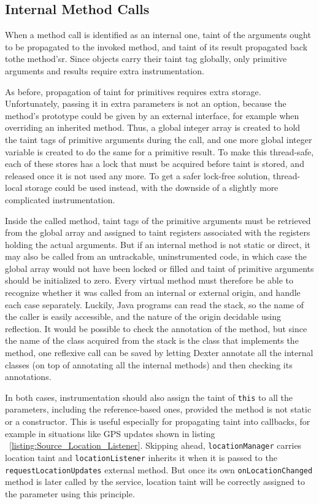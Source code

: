 \documentclass[12pt,twoside,notitlepage]{report}
\begin{document}
\subsection{Internal Method Calls}
\label{section:TaintPropagation_MethodCalls_Internal}

When a method call is identified as an internal one, taint of the arguments ought to be propagated to the invoked method, and taint of its result propagated back tothe method'sr. Since objects carry their taint tag globally, only primitive arguments and results require extra instrumentation. 

As before, propagation of taint for primitives requires extra storage. Unfortunately, passing it in extra parameters is not an option, because the method's prototype could be given by an external interface, for example when overriding an inherited method. Thus, a global integer array is created to hold the taint tags of primitive arguments during the call, and one more global integer variable is created to do the same for a primitive result. To make this thread-safe, each of these stores has a lock that must be acquired before taint is stored, and released once it is not used any more. To get a safer lock-free solution, thread-local storage could be used instead, with the downside of a slightly more complicated instrumentation.

Inside the called method, taint tags of the primitive arguments must be retrieved from the global array and assigned to taint registers associated with the registers holding the actual arguments. But if an internal method is not static or direct, it may also be called from an untrackable, uninstrumented code, in which case the global array would not have been locked or filled and taint of primitive arguments should be initialized to zero. Every virtual method must therefore be able to recognize whether it was called from an internal or external origin, and handle each case separately. Luckily, Java programs can read the stack, so the name of the caller is easily accessible, and the nature of the origin decidable using reflection. It would be possible to check the annotation of the method, but since the name of the class acquired from the stack is the class that implements the method, one reflexive call can be saved by letting Dexter annotate all the internal classes (on top of annotating all the internal methods) and then checking its annotations.

In both cases, instrumentation should also assign the taint of \verb$this$ to all the parameters, including the reference-based ones, provided the method is not static or a constructor. This is useful especially for propagating taint into callbacks, for example in situations like GPS updates shown in listing ~\ref{listing:Source_Location_Listener}. Skipping ahead, \verb$locationManager$ carries location taint and \verb$locationListener$ inherits it when it is passed to the \verb$requestLocationUpdates$ external method. But once its own \verb$onLocationChanged$ method is later called by the service, location taint will be correctly assigned to the parameter using this principle. 
\end{document}
